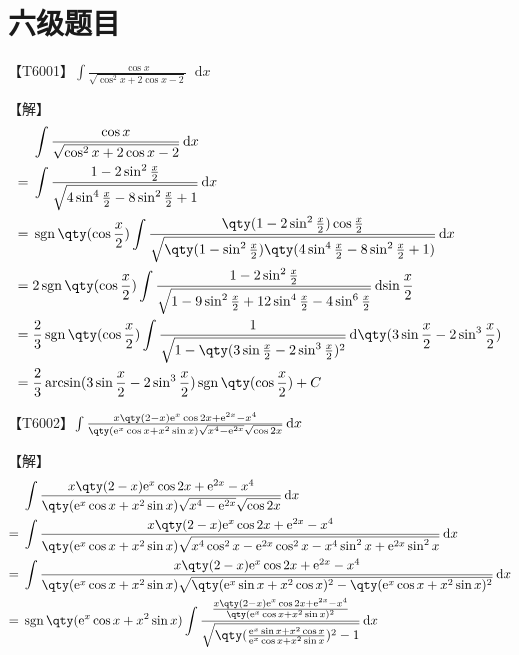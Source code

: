 \documentclass{ctexbook}
\DeclareMathOperator{\sgn}{sgn}
\newcommand{\e}{\mathrm{e}}
\newcommand*{\dif}{\mathop{}\!\mathrm{d}}
\begin{document}
{\chapter*{六级题目}
【T6001】$\int\frac{\cos{x}}{\sqrt{\cos^{2}{x}+2\cos{x}-2}}\dif{x}$\par
【解】
\begin{align*}
{}&\int\frac{\cos{x}}{\sqrt{\cos^{2}{x}+2\cos{x}-2}}\dif{x}\\
={}&\int\frac{1-2\sin^{2}{\frac{x}{2}}}{\sqrt{4\sin^{4}{\frac{x}{2}}-8\sin^{2}{\frac{x}{2}}+1}}\dif{x}\\
={}&\sgn\qty(\cos{\frac{x}{2}})\int\frac{\qty(1-2\sin^{2}{\frac{x}{2}})\cos{\frac{x}{2}}}{\sqrt{\qty(1-\sin^{2}{\frac{x}{2}})\qty(4\sin^{4}{\frac{x}{2}}-8\sin^{2}\frac{x}{2}+1)}}\dif{x}\\
={}&2\sgn\qty(\cos{\frac{x}{2}})\int\frac{1-2\sin^{2}{\frac{x}{2}}}{\sqrt{1-9\sin^{2}{\frac{x}{2}}+12\sin^{4}{\frac{x}{2}}-4\sin^{6}{\frac{x}{2}}}}\dif{\sin{\frac{x}{2}}}\\
={}&\frac{2}{3}\sgn\qty(\cos{\frac{x}{2}})\int\frac{1}{\sqrt{1-\qty(3\sin{\frac{x}{2}}-2\sin^{3}{\frac{x}{2}})^{2}}}\dif{\qty(3\sin{\frac{x}{2}}-2\sin^{3}{\frac{x}{2}})}\\
={}&\frac{2}{3}\arcsin(3\sin{\frac{x}{2}}-2\sin^{3}{\frac{x}{2}})\sgn\qty(\cos{\frac{x}{2}})+C
\end{align*}\par
【T6002】$\int\frac{x\qty(2-x)\e^{x}\cos{2x}+\e^{2x}-x^{4}}{\qty(\e^{x}\cos{x}+x^{2}\sin{x})\sqrt{x^{4}-\e^{2x}}\sqrt{\cos{2x}}}\dif{x}$\par
【解】
\begin{align*}
{}&\int\frac{x\qty(2-x)\e^{x}\cos{2x}+\e^{2x}-x^{4}}{\qty(\e^{x}\cos{x}+x^{2}\sin{x})\sqrt{x^{4}-\e^{2x}}\sqrt{\cos{2x}}}\dif{x}\\
={}&\int\frac{x\qty(2-x)\e^{x}\cos{2x}+\e^{2x}-x^{4}}{\qty(\e^{x}\cos{x}+x^{2}\sin{x})\sqrt{x^{4}\cos^{2}{x}-\e^{2x}\cos^{2}{x}-x^{4}\sin^{2}{x}+\e^{2x}\sin^{2}{x}}}\dif{x}\\
={}&\int\frac{x\qty(2-x)\e^{x}\cos{2x}+\e^{2x}-x^{4}}{\qty(\e^{x}\cos{x}+x^{2}\sin{x})\sqrt{\qty(\e^{x}\sin{x}+x^{2}\cos{x})^{2}-\qty(\e^{x}\cos{x}+x^{2}\sin{x})^{2}}}\dif{x}\\
={}&\sgn\qty(\e^{x}\cos{x}+x^{2}\sin{x})\int\frac{\frac{x\qty(2-x)\e^{x}\cos{2x}+\e^{2x}-x^{4}}{\qty(\e^{x}\cos{x}+x^{2}\sin{x})^{2}}}{\sqrt{\qty(\frac{\e^{x}\sin{x}+x^{2}\cos{x}}{\e^{x}\cos{x}+x^{2}\sin{x}})^{2}-1}}\dif{x}
\end{align*}
}
\end{document}
